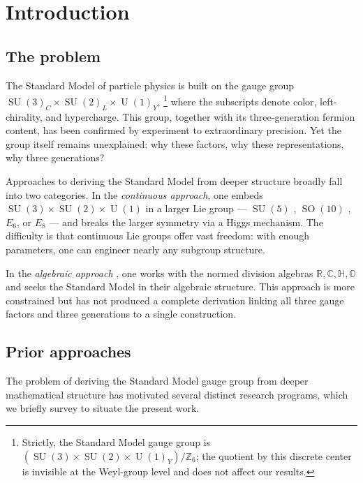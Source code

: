 \documentclass[11pt,reqno]{amsart}
\theoremstyle{plain}
\theoremstyle{definition}
\theoremstyle{remark}
\newcommand{\R}{\mathbb{R}}
\newcommand{\Z}{\mathbb{Z}}
\newcommand{\C}{\mathbb{C}}
\newcommand{\HH}{\mathbb{H}}
\newcommand{\OO}{\mathbb{O}}
\DeclareMathOperator{\SO}{SO}
\DeclareMathOperator{\SU}{SU}
\DeclareMathOperator{\U}{U}
\begin{document}
\section{Introduction}\label{sec:intro}

\subsection{The problem}

The Standard Model of particle physics is built on the gauge group
$\SU(3)_C \times \SU(2)_L \times \U(1)_Y$,%
\footnote{Strictly, the Standard Model gauge group is
$(\SU(3) \times \SU(2) \times \U(1)_Y)/\Z_6$;
the quotient by this discrete center is invisible at the
Weyl-group level and does not affect our results.}
where the subscripts denote color, left-chirality, and hypercharge.
This group, together with its three-generation fermion content,
has been confirmed by experiment to extraordinary precision.
Yet the group itself remains unexplained:
why these factors, why these representations, why three generations?

Approaches to deriving the Standard Model from deeper structure
broadly fall into two categories.
In the \emph{continuous approach}, one embeds
$\SU(3)\times\SU(2)\times\U(1)$ in a larger Lie group ---
$\SU(5)$ \cite{GeorgiGlashow1974},
$\SO(10)$ \cite{FritzschMinkowski1975},
$E_6$, or $E_8$ \cite{Lisi2007} ---
and breaks the larger symmetry via a Higgs mechanism.
The difficulty is that continuous Lie groups offer vast freedom:
with enough parameters, one can engineer nearly any subgroup structure.

In the \emph{algebraic approach}
\cite{Furey2016,Dixon1994,Boyle2020},
one works with the normed division algebras
$\R,\C,\HH,\OO$ and seeks the Standard Model in their
algebraic structure. This approach is more constrained but has not
produced a complete derivation linking all three gauge factors and
three generations to a single construction.

\subsection{Prior approaches}\label{sec:priorapproaches}

The problem of deriving the Standard Model gauge group from
deeper mathematical structure has motivated several distinct
research programs, which we briefly survey to situate the
present work.
\end{document}

